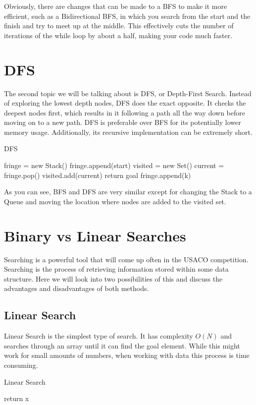 \documentclass[11pt]{article}
\begin{document}
Obviously, there are changes that can be made to a BFS to make it more efficient, such as a Bidirectional BFS, in which you search from the start and the finish and try to meet up at the middle. This effectively cuts the number of iterations of the while loop by about a half, making your code much faster.

\section{DFS}
The second topic we will be talking about is DFS, or Depth-First Search. Instead of exploring the lowest depth nodes, DFS does the exact opposite. It checks the deepest nodes first, which results in it following a path all the way down before moving on to a new path. DFS is preferable over BFS for its potentially lower memory usage. Additionally, its recursive implementation can be extremely short.
\begin{algorithm} 
        \caption{DFS}\label{alg:prop}
        \begin{algorithmic}[1]
        \State fringe = new Stack()
        \State fringe.append(start)
        \State visited = new Set()
            current = fringe.pop()
            visited.add(current)
                return goal
            \EndIf
                    \State fringe.append(k)
                \EndIf
            \EndFor
        \EndWhile
        \end{algorithmic}
        \end{algorithm} 
        
As you can see, BFS and DFS are very similar except for changing the Stack to a Queue and moving the location where nodes are added to the visited set. 

\section{Binary vs Linear Searches}
    Searching is a powerful tool that will come up often in the USACO competition. Searching is the process of retrieving information stored within some data structure. Here we will look into two possibilities of this and discuss the advantages and disadvantages of both methods. 
    
    \subsection{Linear Search}
         Linear Search is the simplest type of search. It has complexity $O(N)$ and searches through an array until it can find the goal element. While this might work for small amounts of numbers, when working with data this process is time consuming.
        \begin{algorithm}
        \caption{Linear Search}\label{alg:prop}
        \begin{algorithmic}[1]
                return x
            \EndIf
        \EndFor
        \end{algorithmic}
        \end{algorithm} 
\end{document}
